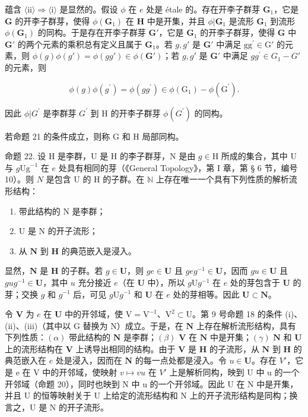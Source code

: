 蕴含 \(\langle \mathrm{ii}\rangle \Rightarrow \langle \mathrm{i}\rangle\) 是显然的。假设 \(\phi\) 在 \(e\) 处是 étale 的。存在开李子群芽 \(\mathbf{G}_1\)，它是 \(\mathbf{G}\) 的开李子群芽，使得 \(\phi (\mathbf{G}_1)\) 在 \(\mathbf{H}\) 中是开集，并且 \(\phi |\mathbf{G}_1\) 是流形 \(\mathbf{G}_1\) 到流形 \(\phi (\mathbf{G}_1)\) 的同构。于是存在开李子群芽 \(\mathbf{G}'\)，它是 \(\mathbf{G}_1\) 的开李子群芽，使得 \(\mathbf{G}\) 中 \(\mathbf{G}'\) 的两个元素的乘积总有定义且属于 \(\mathbf{G}_1\)。若 \(g, g'\) 是 \(\mathbf{G}'\) 中满足 \(\mathrm{gg}^{\prime}\in \mathrm{G}'\) 的元素，则 \(\phi (g)\phi (g') = \phi (gg')\in \phi (\mathbf{G}')\)；若 \(g, g'\) 是 \(\mathbf{G}'\) 中满足 \(gg^{\prime}\in G_1 - G'\) 的元素，则

\[
\phi (g) \phi (g ^ {\prime}) = \phi (g g ^ {\prime}) \in \phi (\mathrm{G} _ {1}) - \phi (\mathrm{G} ^ {\prime}).
\]

因此 \(\phi |G^{\prime}\) 是李群芽 \(G^{\prime}\) 到 H 的开李子群芽 \(\phi (G^{\prime})\) 的同构。

若命题 21 的条件成立，则称 G 和 H 局部同构。

命题 22. 设 H 是李群，U 是 H 的李子群芽，N 是由 \(g \in \mathrm{H}\) 所成的集合，其中 U 与 \(g\mathrm{Ug}^{-1}\) 在 \(e\) 处具有相同的芽（《General Topology》，第 I 章，第 § 6 节，编号 10）。则 \(N\) 是包含 U 的 H 的子群。在 \(\mathbb{N}\) 上存在唯一一个具有下列性质的解析流形结构：

\begin{enumerate}
\def\labelenumi{(\roman{enumi})}
\item
  带此结构的 N 是李群；
\item
  U 是 N 的开子流形；
\item
  从 \(\mathbf{N}\) 到 \(\mathbf{H}\) 的典范嵌入是浸入。
\end{enumerate}

显然，\(\mathbf{N}\) 是 \(\mathbf{H}\) 的子群。若 \(g \in \mathbf{U}\)，则 \(ge \in \mathbf{U}\) 且 \(geg^{-1} \in \mathbf{U}\)，因而 \(gu \in \mathbf{U}\) 且 \(gug^{-1} \in \mathbf{U}\)，其中 \(u\) 充分接近 \(e\)（在 \(\mathbf{U}\) 中），所以 \(g\mathrm{U}g^{-1}\) 在 \(e\) 处的芽包含于 \(\mathbf{U}\) 的芽；交换 \(g\) 和 \(g^{-1}\) 后，可见 \(g\mathrm{U}g^{-1}\) 和 \(\mathbf{U}\) 在 \(e\) 处的芽相等。因此 \(\mathbf{U} \subset \mathbf{N}\)。

令 \(\mathbf{V}\) 为 \(e\) 在 \(\mathbf{U}\) 中的开邻域，使 \(\mathrm{V} = \mathrm{V}^{-1}\)、\(\mathrm{V}^2 \subset \mathrm{U}\)。第 9 号命题 18 的条件 (i)、(ii)、(iii)（其中以 \(\mathrm{G}\) 替换为 \(\mathrm{N}\)）成立。于是，在 \(\mathbf{N}\) 上存在解析流形结构，具有下列性质：\((\alpha)\) 带此结构的 \(\mathbf{N}\) 是李群；\((\beta)\) \(\mathbf{V}\) 在 \(\mathbf{N}\) 中是开集；\((\gamma)\) \(\mathbf{N}\) 和 \(\mathbf{U}\) 上的流形结构在 \(\mathbf{V}\) 上诱导出相同的结构。由于 \(\mathbf{V}\) 是 \(\mathbf{H}\) 的子流形，从 \(\mathbf{N}\) 到 \(\mathbf{H}\) 的典范嵌入在 \(e\) 处是浸入，因而在 \(\mathbf{N}\) 的每一点处都是浸入。令 \(u \in \mathbf{U}\)。存在 \(V'\)，它是 e 在 V 中的开邻域，使映射 \(v \mapsto vu\) 在 \(V'\) 上是解析同构，映到 U 中 u 的一个开邻域（命题 20），同时也映到 N 中 u 的一个开邻域。因此 U 在 N 中是开集，并且 U 的恒等映射关于 U 上给定的流形结构和 N 上的开子流形结构是同构；换言之，U 是 N 的开子流形。

